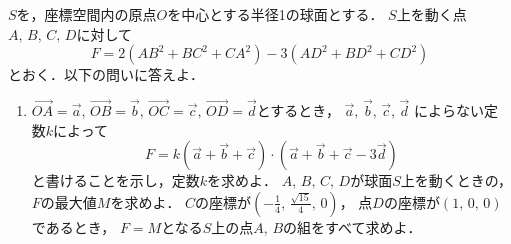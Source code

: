 \documentclass[../../main.tex]{subfiles}
\begin{document}
$S$を，座標空間内の原点$O$を中心とする半径1の球面とする．
$S$上を動く点$A, \, B, \, C, \, D$に対して
\[ F=2({AB}^2+{BC}^2+{CA}^2)-3({AD}^2+{BD}^2+{CD}^2) \]
とおく．以下の問いに答えよ．
\begin{enumerate}
  \item$\overrightarrow{OA}=\overrightarrow{a}, \,
    \overrightarrow{OB}=\overrightarrow{b}, \,
    \overrightarrow{OC}=\overrightarrow{c}, \,
    \overrightarrow{OD}=\overrightarrow{d}$とするとき，
    $\overrightarrow{a}, \, \overrightarrow{b}, \, \overrightarrow{c}, \, \overrightarrow{d}$
    によらない定数$k$によって
    \[ F=k(\overrightarrow{a}+\overrightarrow{b}+\overrightarrow{c}) \cdot
    (\overrightarrow{a}+\overrightarrow{b}+\overrightarrow{c}-3\overrightarrow{d}) \]
    と書けることを示し，定数$k$を求めよ．
  $A, \, B, \, C, \, D$が球面$S$上を動くときの，$F$の最大値$M$を求めよ．
  $C$の座標が$\displaystyle(-\frac{1}{4}, \, \frac{\sqrt{15}}{4}, \, 0)$，
    点$D$の座標が$(1, \, 0, \, 0)$であるとき，
    $F=M$となる$S$上の点$A, \, B$の組をすべて求めよ．
\end{enumerate}
\end{document}
